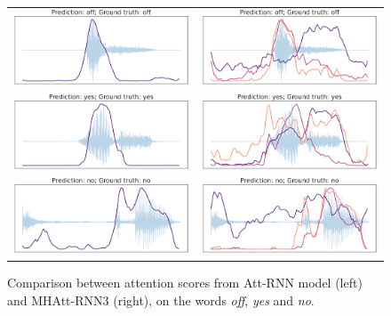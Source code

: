 \begin{figure}
	\centering
	\begin{tabular}{cc}
		\includegraphics[width = 0.45\linewidth]{imgs/att_scores12_23_andreade.pdf} &
		\includegraphics[width = 0.45\linewidth]{imgs/att_scores12_23.pdf}\\
		\includegraphics[width = 0.45\linewidth]{imgs/att_scores12_42_andreade.pdf} &
		\includegraphics[width = 0.45\linewidth]{imgs/att_scores12_42.pdf}\\
		\includegraphics[width = 0.45\linewidth]{imgs/att_scores12_72_andreade.pdf} &
		\includegraphics[width = 0.45\linewidth]{imgs/att_scores12_72.pdf}
	\end{tabular}
	\caption{Comparison between attention scores from  Att-RNN model (left) and MHAtt-RNN3 (right), on the words \textit{off}, \textit{yes} and \textit{no}. }
	\label{fig:att_scores}
\end{figure}

